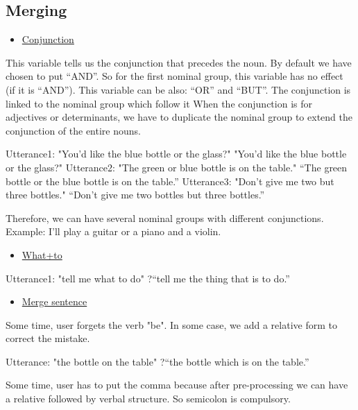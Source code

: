 \documentclass[twoside,a4paper,10pt]{report}
\begin{document}
\subsection{Merging}
\label{65cc30ed55db36c739ab349d7c58dfe8}%

\begin{itemize}
    \item  \underline{Conjunction}
\end{itemize}
This variable tells us the conjunction that precedes the noun. By default we have chosen to put “AND”. So for the first nominal group, this variable has no effect (if it is “AND”). This variable can be also: “OR” and “BUT”. The conjunction is linked to the nominal group which follow it
When the conjunction is for adjectives or determinants, we have to duplicate the nominal group to extend the conjunction of the entire nouns.


\small
\begin{verbatimtab}
  Utterance1: "You'd like the blue bottle or the glass?"
  "You'd like the blue bottle or the glass?"
  Utterance2: "The green or blue bottle is on the table."
  “The green bottle or the blue bottle is on the table.”
  Utterance3: "Don’t give me two but three bottles."
  “Don’t give me two bottles but three bottles.”
\end{verbatimtab}
\normalsize
Therefore, we can have several nominal groups with different conjunctions. Example: I'll play a guitar or a piano and a violin.



\begin{itemize}
    \item  \underline{What+to}
\end{itemize}
    Utterance1: "tell me what to do"
    ?“tell me the thing that is to do.”



\begin{itemize}
    \item  \underline{Merge sentence}
\end{itemize}
Some time, user forgets the verb "be". In some case, we add a relative form to correct the mistake.


\small
\begin{verbatimtab}
  Utterance: "the bottle on the table" 
  ?“the bottle which is on the table.”
\end{verbatimtab}
\normalsize
Some time, user has to put the comma because after pre-processing we can have a relative followed by verbal structure. So semicolon is compulsory.
\end{document}
